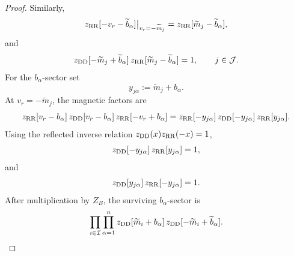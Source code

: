 \documentclass[11pt,a4paper]{article}
\numberwithin{equation}{section}
\theoremstyle{plain}
\theoremstyle{definition}
\theoremstyle{remark}
\begin{document}
\begin{proof}
Similarly,
\begin{equation}
z_{\rm RR}[-v_r-\widetilde b_\alpha]\big|_{v_r=-\widetilde m_j}
=
z_{\rm RR}[\widetilde m_j-\widetilde b_\alpha],
\end{equation}
and
\begin{equation}
z_{\rm DD}[-\widetilde m_j+\widetilde b_\alpha]\,
z_{\rm RR}[\widetilde m_j-\widetilde b_\alpha]=1,
\qquad j\in\mathcal J .
\end{equation}
For the \(b_\alpha\)-sector set
\begin{equation}
y_{j\alpha}:=\widetilde m_j+b_\alpha .
\end{equation}
At \(v_r=-\widetilde m_j\), the magnetic factors are
\begin{equation}
z_{\rm RR}[v_r-b_\alpha]\,
z_{\rm DD}[v_r-b_\alpha]\,
z_{\rm RR}[-v_r+b_\alpha]
=
z_{\rm RR}[-y_{j\alpha}]\,
z_{\rm DD}[-y_{j\alpha}]\,
z_{\rm RR}[y_{j\alpha}] .
\end{equation}
Using the reflected inverse relation \(z_{\rm DD}(x)z_{\rm RR}(-x)=1\),
\begin{equation}
z_{\rm DD}[-y_{j\alpha}]\,
z_{\rm RR}[y_{j\alpha}]=1,
\end{equation}
and
\begin{equation}
z_{\rm DD}[y_{j\alpha}]\,
z_{\rm RR}[-y_{j\alpha}]=1 .
\end{equation}
After multiplication by \(Z_B\), the surviving \(b_\alpha\)-sector is
\begin{equation}
\prod_{i\in\mathcal I}\prod_{\alpha=1}^{n}
z_{\rm DD}[\widetilde m_i+b_\alpha]\,
z_{\rm DD}[-\widetilde m_i+\widetilde b_\alpha].
\label{eq:UNc-reint-b-leftover}
\end{equation}


\end{proof}
\end{document}
